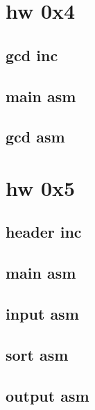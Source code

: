 \section{hw 0x4}
    \subsection{gcd inc}
                
    \subsection{main asm}
              
    \subsection{gcd asm}
               

\section{hw 0x5}
    \subsection{header inc}
                
    \subsection{main asm}
              
    \subsection{input asm}
                  
    \subsection{sort asm}
            
    \subsection{output asm}
            
    
    